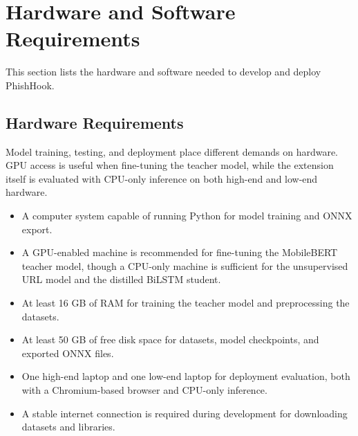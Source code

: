 \documentclass{FastFyp}
\begin{document}
\section{Hardware and Software Requirements}
This section lists the hardware and software needed to develop and deploy PhishHook.

\subsection{Hardware Requirements}
Model training, testing, and deployment place different demands on hardware. GPU access is useful when fine-tuning the teacher model, while the extension itself is evaluated with CPU-only inference on both high-end and low-end hardware.
\begin{itemize}
   \item A computer system capable of running Python for model training and ONNX export.
    \item A GPU-enabled machine is recommended for fine-tuning the MobileBERT teacher model, though a CPU-only machine is sufficient for the unsupervised URL model and the distilled BiLSTM student.
    \item At least 16 GB of RAM for training the teacher model and preprocessing the datasets.
    \item At least 50 GB of free disk space for datasets, model checkpoints, and exported ONNX files.
    \item One high-end laptop and one low-end laptop for deployment evaluation, both with a Chromium-based browser and CPU-only inference.
    \item A stable internet connection is required during development for downloading datasets and libraries.
\end{itemize}
\end{document}
